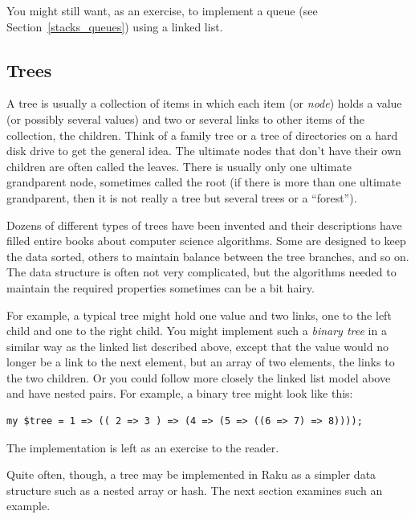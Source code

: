 You might still want, as an exercise, to implement a queue 
(see Section~\ref{stacks_queues}) using a linked list. 

\subsection{Trees}
\label{tree}

A tree is usually a collection of items in which each 
item (or \emph{node}) holds a value (or possibly 
several values) and two or several 
links to other items of the collection, the children. Think 
of a family tree or a tree of directories on a hard disk 
drive to get the general idea. The ultimate 
nodes that don't have their own children are often called 
the leaves. There is usually only one ultimate grandparent 
node, sometimes called the root (if there is more than one 
ultimate grandparent, then it is not really a tree but 
several trees or a ``forest'').

Dozens of different types of trees have been invented and 
their descriptions have filled entire books about computer 
science algorithms. Some are designed 
to keep the data sorted, others to maintain balance between 
the tree branches, and so on. The data structure is often 
not very complicated, but the algorithms needed to maintain the 
required properties sometimes can be a bit hairy.

For example, a 
typical tree might hold one value and two links, one to 
the left child and one to the right child. You 
might implement such a \emph{binary tree} in a similar way as the 
linked list described above, except that the value 
would no longer be a link to the next element, but an 
array of two elements, the links to the two children. 
Or you could follow more closely the linked list model 
above and have nested pairs. For example, a binary tree 
might look like this:

\begin{verbatim}
my $tree = 1 => (( 2 => 3 ) => (4 => (5 => ((6 => 7) => 8))));
\end{verbatim}

The implementation is left as an exercise to the reader. 

Quite often, though, a tree may be implemented in Raku 
as a simpler data structure such as a nested array or hash. 
The next section examines such an example.

